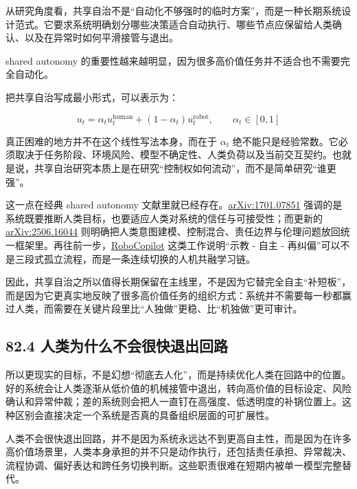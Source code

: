 从研究角度看，共享自治不是“自动化不够强时的临时方案”，而是一种长期系统设计范式。它要求系统明确划分哪些决策适合自动执行、哪些节点应保留给人类确认、以及在异常时如何平滑接管与退出。

shared autonomy 的重要性越来越明显，因为很多高价值任务并不适合也不需要完全自动化。

把共享自治写成最小形式，可以表示为：

\begingroup
\scriptsize
\begin{equation*}
u_t = \alpha_t u_t^{\text{human}} + (1-\alpha_t)u_t^{\text{robot}}, \qquad
\alpha_t \in [0,1]
\end{equation*}
\endgroup

真正困难的地方并不在这个线性写法本身，而在于 \(\alpha_t\) 绝不能只是经验常数。它必须取决于任务阶段、环境风险、模型不确定性、人类负荷以及当前交互契约。也就是说，共享自治研究本质上是在研究“控制权如何流动”，而不是简单研究“谁更强”。

这一点在经典 shared autonomy 文献里就已经存在。\href{https://arxiv.org/abs/1701.07851}{arXiv:1701.07851} 强调的是系统既要推断人类目标，也要适应人类对系统的信任与可接受性；而更新的 \href{https://arxiv.org/abs/2506.16044}{arXiv:2506.16044} 则明确把人类意图建模、控制混合、责任边界与伦理问题放回统一框架里。再往前一步，\href{https://arxiv.org/abs/2503.07771}{RoboCopilot} 这类工作说明“示教 - 自主 - 再纠偏”可以不是三段式孤立流程，而是一条连续切换的人机共融学习链。

因此，共享自治之所以值得长期保留在主线里，不是因为它替完全自主“补短板”，而是因为它更真实地反映了很多高价值任务的组织方式：系统并不需要每一秒都赢过人类，而需要在关键片段里比“人独做”更稳、比“机独做”更可审计。

\subsection*{82.4 人类为什么不会很快退出回路}


所以更现实的目标，不是幻想“彻底去人化”，而是持续优化人类在回路中的位置。好的系统会让人类逐渐从低价值的机械接管中退出，转向高价值的目标设定、风险确认和异常仲裁；差的系统则会把人一直钉在高强度、低透明度的补锅位置上。这种区别会直接决定一个系统是否真的具备组织层面的可扩展性。

人类不会很快退出回路，并不是因为系统永远达不到更高自主性，而是因为在许多高价值场景里，人类本身承担的并不只是动作执行，还包括责任承担、异常裁决、流程协调、偏好表达和跨任务切换判断。这些职责很难在短期内被单一模型完整替代。

